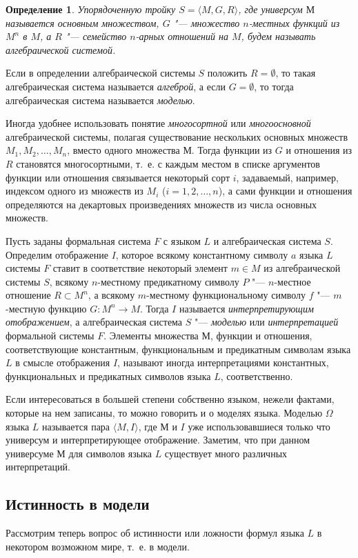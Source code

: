 \documentclass[b5paper,11pt]{book}
\newtheorem{Def}{Определение}
\begin{document}
	\begin{Def}
		Упорядоченную тройку  $S=\langle M, G, R\rangle$, где универсум $М$ называется основным множеством, $G$ "--- множество $n$-местных функций из $M^n$ в $M$, а $R$ "--- семейство $n$-арных отношений на $M$, будем называть алгебраической системой. 
	\end{Def}
	Если в определении алгебраической системы $S$ положить $R=\emptyset$, то такая алгебраическая система называется \textit{алгеброй}, а если $G=\emptyset$, то тогда алгебраическая система называется \textit{моделью}. 
	
	Иногда удобнее использовать  понятие \textit{многосортной} или \textit{многоосновной} алгебраической системы, полагая  существование нескольких основных множеств $M_1,M_2,\dots,M_n$, вместо одного множества $М$. Тогда функции из $G$ и отношения из $R$ становятся многосортными, т.~е. с каждым местом в списке аргументов функции или отношения связывается  некоторый сорт $i$, задаваемый, например, индексом одного из множеств из $M_i$ ($i=1,2,\dots,n$), а сами функции и отношения определяются на декартовых произведениях множеств из числа основных множеств.
	
	Пусть заданы формальная система $F$ с языком $L$ и алгебраическая система $S$. Определим  отображение $I$, которое всякому константному символу $a$ языка $L$ системы $F$ ставит в соответствие некоторый элемент $m\in M$ из алгебраической системы $S$, всякому $n$-местному предикатному символу $P$ "--- $n$-местное отношение $R\subset M^n$, а всякому $m$-местному функциональному символу $f$ "--- $m$-местную функцию $G:M^n\rightarrow M$. Тогда $I$ называется \textit{интерпретирующим отображением}, а  алгебраическая система $S$ "--- \textit{моделью} или \textit{интерпретацией} формальной системы $F$. Элементы множества $М$, функции и отношения, соответствующие константным, функциональным и предикатным символам языка $L$ в смысле отображения $I$, называют иногда интерпретациями константных, функциональных и предикатных  символов языка $L$, соответственно.
	
	Если интересоваться в большей степени собственно языком, нежели фактами, которые на нем записаны, то можно говорить и о моделях языка. Моделью $\Omega$ языка $L$ называется  пара $\langle M, I\rangle$, где $М$ и $I$ уже использовавшиеся только что универсум и интерпретирующее отображение. Заметим, что при данном универсуме $М$ для символов языка $L$ существует много различных интерпретаций.
	
	\subsection{Истинность в модели}
	Рассмотрим теперь вопрос об истинности или ложности формул языка $L$ в некотором возможном мире, т.~е. в модели. 
	
\end{document}

